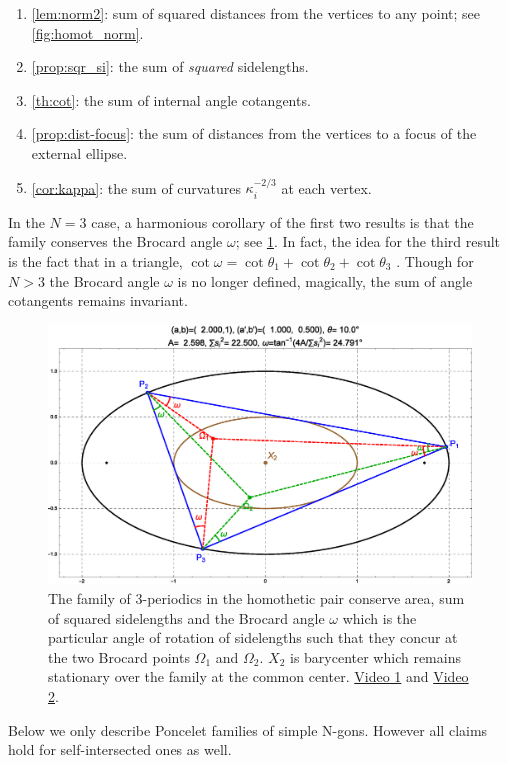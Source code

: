 \begin{enumerate}
    \item \cref{lem:norm2}: sum of squared distances from the vertices to any point; see \cref{fig:homot_norm}.
    \item \cref{prop:sqr_si}: the sum of {\em squared} sidelengths.
    \item \cref{th:cot}: the sum of internal angle cotangents.
    \item \cref{prop:dist-focus}: the sum of distances from the vertices to a focus of the external ellipse.
    \item \cref{cor:kappa}: the sum of curvatures $\kappa_i^{-2/3}$ at each vertex.
\end{enumerate}

In the $N=3$ case, a harmonious corollary of the first two results is that the family conserves the Brocard angle $\omega$; see \cref{fig:brocard-n3}. In fact, the idea for the third result is the fact that in a triangle, $\cot\omega=\cot\theta_1+\cot\theta_2+\cot\theta_3$ \cite[Brocard Angle]{mw}. Though for $N>3$ the Brocard angle $\omega$ is no longer defined, magically, the sum of angle cotangents remains invariant.

\begin{figure}
    \centering
\includegraphics[width=\textwidth]{pics/0040_brocard_n3.eps}
\caption{The family of 3-periodics in the homothetic pair conserve area, sum of squared sidelengths and the Brocard angle $\omega$ which is the particular angle of rotation of sidelengths such that they concur at the two Brocard points $\Omega_1$ and $\Omega_2$. $X_2$ is barycenter which remains stationary over the family at the common center. \href{https://youtu.be/2fvGd8wioZY}{Video 1} and \href{https://youtu.be/13i3JGY-fK4}{Video 2}.}
    \label{fig:brocard-n3}
\end{figure}

Below we only describe Poncelet families of simple N-gons. However all claims hold for self-intersected ones as well.

